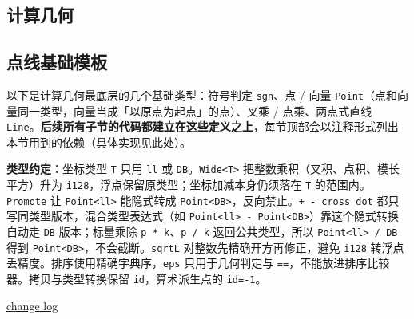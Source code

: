 	\begin{center}
		\section{计算几何}
	\end{center}

	\subsection{点线基础模板}

		以下是计算几何最底层的几个基础类型：符号判定 \texttt{sgn}、点 / 向量 \texttt{Point}（点和向量同一类型，向量当成「以原点为起点」的点）、叉乘 / 点乘、两点式直线 \texttt{Line}。\textbf{后续所有子节的代码都建立在这些定义之上}，每节顶部会以注释形式列出本节用到的依赖（具体实现见此处）。

		\textbf{类型约定}：坐标类型 \texttt{T} 只用 \texttt{ll} 或 \texttt{DB}。\texttt{Wide<T>} 把整数乘积（叉积、点积、模长平方）升为 \texttt{i128}，浮点保留原类型；坐标加减本身仍须落在 \texttt{T} 的范围内。\texttt{Promote} 让 \texttt{Point<ll>} 能隐式转成 \texttt{Point<DB>}，反向禁止。\texttt{+ - cross dot} 都只写同类型版本，混合类型表达式（如 \texttt{Point<ll> - Point<DB>}）靠这个隐式转换自动走 \texttt{DB} 版本；标量乘除 \texttt{p * k}、\texttt{p / k} 返回公共类型，所以 \texttt{Point<ll> / DB} 得到 \texttt{Point<DB>}，不会截断。\texttt{sqrtL} 对整数先精确开方再修正，避免 \texttt{i128} 转浮点丢精度。排序使用精确字典序，\texttt{eps} 只用于几何判定与 \texttt{==}，不能放进排序比较器。拷贝与类型转换保留 \texttt{id}，算术派生点的 \texttt{id=-1}。

		\href{https://gist.github.com/znzryb/11d094702ccdb989efb8aed573ab0885}{change log}

